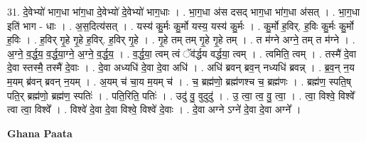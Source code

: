 \documentclass[17pt]{extarticle}
\begin{document}
31. दे॒वेभ्यो॑ भाग॒धा भा॑ग॒धा दे॒वेभ्यो॑ दे॒वेभ्यो॑ भाग॒धाः । . भा॒ग॒धा अ॑स दसद् भाग॒धा भा॑ग॒धा अ॑सत् । . भा॒ग॒धा इति॑ भाग - धाः । . अ॒स॒दित्य॑सत् । . यस्य॑ कु॒र्मः कु॒र्मो यस्य॒ यस्य॑ कु॒र्मः । . कु॒र्मो ह॒विर्. ह॒विः कु॒र्मः कु॒र्मो ह॒विः । . ह॒विर् गृ॒हे गृ॒हे ह॒विर्. ह॒विर् गृ॒हे । . गृ॒हे तम् तम् गृ॒हे गृ॒हे तम् । . त म॑ग्ने अग्ने॒ तम् त म॑ग्ने । . अ॒ग्ने॒ व॒र्द्ध॒य॒ व॒र्द्ध॒या॒ग्ने॒ अ॒ग्ने॒ व॒र्द्ध॒य॒ । . व॒र्द्ध॒या॒ त्वम् त्वं ॅव॑र्द्धय वर्द्धया॒ त्वम् । . त्वमिति॒ त्वम् । . तस्मै॑ दे॒वा दे॒वा स्तस्मै॒ तस्मै॑ दे॒वाः । . दे॒वा अध्यधि॑ दे॒वा दे॒वा अधि॑ । . अधि॑ ब्रवन् ब्रव॒न् नध्यधि॑ ब्रवन्न् । . ब्र॒व॒न् न॒य म॒यम् ब्र॑वन् ब्रवन् न॒यम् । . अ॒यम् च॑ चा॒य म॒यम् च॑ । . च॒ ब्रह्म॑णो॒ ब्रह्म॑णश्च च॒ ब्रह्म॑णः । . ब्रह्म॑ण॒ स्पति॒ष् पति॒र् ब्रह्म॑णो॒ ब्रह्म॑ण॒ स्पतिः॑ । . पति॒रिति॒ पतिः॑ । . उदु॑ वु॒ वुदुदु॑ । . उ॒ त्वा॒ त्व॒ वु॒ त्वा॒ । . त्वा॒ विश्वे॒ विश्वे᳚ त्वा त्वा॒ विश्वे᳚ । . विश्वे॑ दे॒वा दे॒वा विश्वे॒ विश्वे॑ दे॒वाः । . दे॒वा अग्ने ऽग्ने॑ दे॒वा दे॒वा अग्ने᳚ । \newline

\textbf{Ghana Paata } \newline
\end{document}
